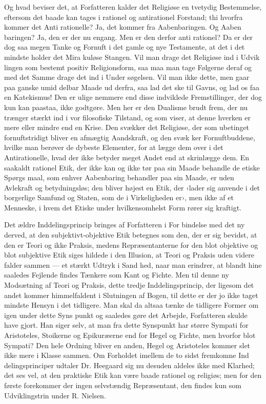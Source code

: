 \documentclass[12pt,a4paper,openany]{book}
\newcommand{\opage}[1]{\marginnote{\footnotesize\textit{[#1]}}}
\begin{document}
Og hvad beviser det, at Forfatteren kalder det Religiøse
en tvetydig Bestemmelse, eftersom det baade kan tages i rationel
og antirationel Forstand; thi hvorfra kommer det Anti\-%
rationelle? Ja, det kommer fra Aabenbaringen. Og Aaben\-%
baringen? Ja, den er der nu engang. Men er den derfor anti\-%
rationel? Da er der dog saa megen Tanke og Fornuft i det
gamle og nye Testamente, at det i det mindste holder det Mira\-%
kuløse Stangen. Vil man drage det Religiøse ind i Udvik\-%
lingen som bestemt positiv Religionsform, saa maa man tage
Følgerne deraf og med det Samme drage det ind i Under\-%
søgelsen. Vil man ikke dette, men gaar paa ganske umid\-%
delbar Maade ud derfra, saa lad det ske til Gavns, og lad os
faa en Katekismus! Den er ulige nemmere end disse indviklede
Fremstillinger, der dog kun kan paastaa, ikke godtgøre. Men
her er den Dualisme brudt frem, der nu trænger stærkt ind i
vor filosofiske Tilstand, og som viser, at denne hverken er mere
eller mindre end en Krise. Den svækker det Religiøse, der som
\opage{31}ubetinget fornuftstridigt bliver en afmægtig Aandskraft, og den svæk\-%
ker Fornuftbuddene, hvilke man berøver de dybeste Elementer,
for at lægge dem over i det Antirationelle, hvad der ikke betyder
meget Andet end at skrinlægge dem. En saakaldt rationel Etik, der
ikke kan og ikke tør paa sin Maade behandle de etiske Spørgs\-%
maal, som enhver Aabenbaring behandler paa sin Maade, er
uden Avlekraft og betydningsløs; den bliver højest en Etik, der
‹lader sig anvende i det borgerlige Samfund og Staten, som de
i Virkeligheden er›, men ikke af et Menneske, i hvem det Etiske
under hvilkensomhelst Form rører sig kraftigt.

Det ældre Inddelingsprincip bringes af Forfatteren i For\-%
bindelse med det ny derved, at den subjektivt-objektive Etik
betegnes som den, der er sig bevidst, at den er Teori og ikke
Praksis, medens Repræsentanterne for den blot objektive og
blot subjektive Etik siges hildede i den Illusion, at Teori og
Praksis uden videre falder sammen --- et stærkt Udtryk i Sand\-%
hed, naar man erindrer, at blandt hine saaledes Fejlende findes
Tænkere som Kant og Fichte. Men til denne ny Modsætning
af Teori og Praksis, dette tredje Inddelingsprincip, der ligesom
det andet kommer himmelfaldent i Slutningen af Bogen, til dette
er der jo ikke taget mindste Hensyn i det tidligere. Man skal
da altsaa tænke de tidligere Former om igen under dette Syns\-%
punkt og saaledes gøre det Arbejde, Forfatteren skulde have
gjort. Han siger selv, at man fra dette Synspunkt har større
Sympati for Aristoteles, Stoikerne og Epikuræerne end for Hegel
og Fichte, men hvorfor blot Sympati? Den hele Ordning bliver
en anden, Hegel og Aristoteles kommer slet ikke mere i Klasse
sammen. Om Forholdet imellem de to sidst fremkomne Ind\-%
delingsprinciper udtaler Dr. Heegaard sig nu desuden aldeles ikke
med Klarhed; det ses vel, at den praktiske Etik kan være baade
rationel og religiøs; men for den første forekommer der ingen
selvstændig Repræsentant, den findes kun som Udviklingstrin
under R. Nielsen.
\end{document}
